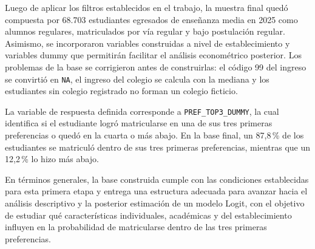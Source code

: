 \documentclass[11pt]{article}
\begin{document}
Luego de aplicar los filtros establecidos en el trabajo, la muestra final
quedó compuesta por 68.703 estudiantes egresados de enseñanza media en
2025 como alumnos regulares, matriculados por vía regular y bajo
postulación regular. Asimismo, se incorporaron variables construidas a
nivel de establecimiento y variables dummy que permitirán facilitar el
análisis econométrico posterior. Los problemas de la base se corrigieron
antes de construirlas: el código 99 del ingreso se convirtió en
\texttt{NA}, el ingreso del colegio se calcula con la mediana y los
estudiantes sin colegio registrado no forman un colegio ficticio.

La variable de respuesta definida corresponde a
\texttt{PREF\_TOP3\_DUMMY}, la cual identifica si el estudiante logró
matricularse en una de sus tres primeras preferencias o quedó en la
cuarta o más abajo. En la base final, un 87,8\,\% de los estudiantes se
matriculó dentro de sus tres primeras preferencias, mientras que un
12,2\,\% lo hizo más abajo.

En términos generales, la base construida cumple con las condiciones
establecidas para esta primera etapa y entrega una estructura adecuada
para avanzar hacia el análisis descriptivo y la posterior estimación de
un modelo Logit, con el objetivo de estudiar qué características
individuales, académicas y del establecimiento influyen en la
probabilidad de matricularse dentro de las tres primeras preferencias.

\end{document}
